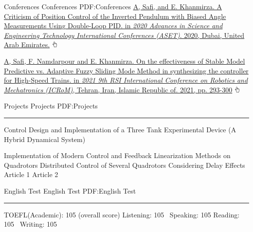 \documentclass[letterpaper,MMMyyyy,nonstopmode]{ResumeTemplate}
\begin{document}
\begin{Body}
\Gap
\endgroup

\BigGap
\SubSection
{Conferences}
{Conferences}
{PDF:Conferences}
\begingroup
\renewcommand{\MaxNumberedItem}{[88]}
\BigGap
\NumberedItem{[4]}
\href{https://ieeexplore.ieee.org/document/9118277}
{\underline{A, Safi}, and E. Khanmirza. A Criticism of Position Control of the Inverted Pendulum with Biased Angle Measurements Using Double-Loop PID. in \textit{2020 Advances in Science and Engineering Technology International Conferences (ASET)}. 2020, Dubai, United Arab Emirates.}
\includegraphics[height=9pt]{icons/hand-cursor.png}

\Gap
\NumberedItem{[5]}
\href{https://ieeexplore.ieee.org/document/9663459}
{\underline{A, Safi}, F. Namdarpour and E. Khanmirza. On the effectiveness of Stable Model Predictive vs. Adaptive Fuzzy Sliding Mode Method in synthesizing the controller for High-Speed Trains. in \textit{2021 9th RSI International Conference on Robotics and Mechatronics (ICRoM)}, Tehran, Iran, Islamic Republic of. 2021, pp. 293-300}
\includegraphics[height=9pt]{icons/hand-cursor.png}

\Gap
\endgroup




\Section
{Projects}
{Projects}
{PDF:Projects}
\textcolor{Forestg}{\vspace{0.05cm}\hrule height 0.1cm}\BigGap
\BulletItem
Control Design and Implementation of a Three Tank Experimental Device (A Hybrid Dynamical System)

\BulletItem
Implementation of Modern Control and Feedback Linearization Methods on Quadrotors
\BulletItem
Distributed Control of Several Quadrotors Considering Delay Effects
\BulletItem
Article 1
\BulletItem
Article 2

\Section
{English Test}
{English Test}
{PDF:English Test}
\textcolor{Forestg}{\vspace{0.05cm}\hrule height 0.1cm}\BigGap
\BulletItem
TOEFL(Academic): 105 (overall score)
\newline
\textbullet Listening: 105  \hspace{10mm}\textbullet\ Speaking: 105
\newline
\textbullet Reading: 105  \hspace{11.5mm}\textbullet\ Writing: 105


\end{Body}
\end{document}
